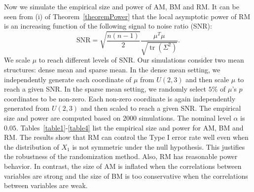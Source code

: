 \documentclass[3p]{elsarticle}
\DeclareMathOperator{\mytr}{tr}
\theoremstyle{plain}
\theoremstyle{definition}
\theoremstyle{remark}
\begin{document}
Now we simulate the empirical size and power of AM, BM and RM.
It can be seen from (i) of Theorem~\ref{theoremPower} that the local asymptotic power of RM is an increasing function of the following signal to noise ratio (SNR):
\begin{equation*}
    \mathrm{SNR}=\sqrt{\frac{n(n-1)}{2}}
    \frac{\mu^T \mu}{\sqrt{\mytr (\Sigma^2)}}.
\end{equation*}
We scale $\mu$ to reach different levels of SNR\@.
Our simulations consider two mean structures: dense mean and sparse mean.
In the dense mean setting,  we independently generate each coordinate of $\mu$ from $U(2,3)$ and then scale $\mu$ to reach a given SNR\@.
In the sparse mean setting, we randomly select $5\%$ of $\mu$'s $p$ coordinates to be non-zero.
Each non-zero coordinate is again independently generated from $U(2,3)$ and then scaled to reach a given SNR\@.
The empirical size and power are computed based on $2000$ simulations.
The nominal level $\alpha$ is $0.05$.
Tables~\ref{table1}-\ref{table4} list the empirical size and power for AM, BM and RM.
The results show that RM can control the Type I error rate well even when the distribution of $X_1$ is not symmetric under the null hypothesis.
This justifies the robustness of the randomization method.
Also, RM has reasonable power behavior.
In contrast, the size of AM is inflated when the correlations between variables are strong and the size of BM is too conservative when the correlations between variables are weak.
\end{document}
